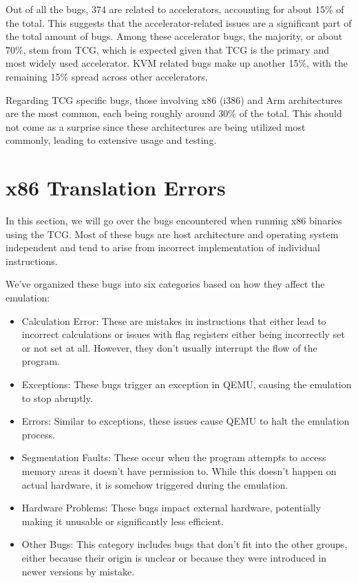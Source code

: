 Out of all the bugs, 374 are related to accelerators, accounting for about 15\% of the total.
This suggests that the accelerator-related issues are a significant part of the total amount of bugs.
Among these accelerator bugs, the majority, or about 70\%, stem from \ac{TCG}, which is expected given that \ac{TCG} is the primary and most widely used accelerator.
KVM related bugs make up another 15\%, with the remaining 15\% spread across other accelerators.

Regarding \ac{TCG} specific bugs, those involving x86 (i386) and Arm architectures are the most common, each being roughly around 30\% of the total.
This should not come as a surprise since these architectures are being utilized most commonly, leading to extensive usage and testing.

\section{x86 Translation Errors}
In this section, we will go over the bugs encountered when running x86 binaries using the \ac{TCG}.
Most of these bugs are host architecture and operating system independent and tend to arise from incorrect implementation of individual instructions.

We've organized these bugs into six categories based on how they affect the emulation:
\begin{itemize}
    \item Calculation Error: These are mistakes in instructions that either lead to incorrect calculations or issues with flag registers either being incorrectly set or not set at all. However, they don't usually interrupt the flow of the program.
    \item Exceptions: These bugs trigger an exception in \ac{QEMU}, causing the emulation to stop abruptly.
    \item Errors: Similar to exceptions, these issues cause \ac{QEMU} to halt the emulation process.
    \item Segmentation Faults: These occur when the program attempts to access memory areas it doesn't have permission to. While this doesn't happen on actual hardware, it is somehow triggered during the emulation.
    \item Hardware Problems: These bugs impact external hardware, potentially making it unusable or significantly less efficient.
    \item Other Bugs: This category includes bugs that don't fit into the other groups, either because their origin is unclear or because they were introduced in newer versions by mistake.
\end{itemize}

